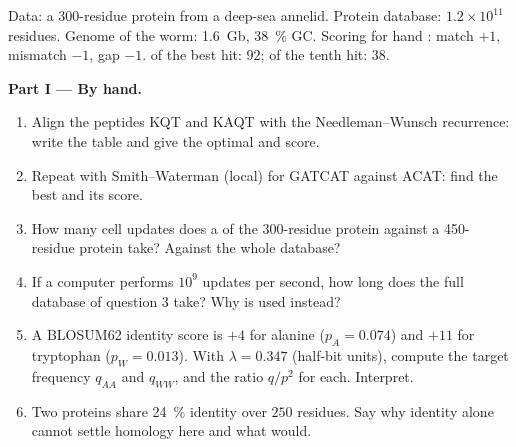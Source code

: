 \begin{problem}
\label{pb:b3:bioinformatics:1}
Data: a \num{300}-residue protein from a deep-sea annelid. Protein
database: $1.2\times 10^{11}$ residues. Genome of the worm:
\qty{1.6}{Gb}, \qty{38}{\%} GC. Scoring for hand : match $+1$,
mismatch $-1$, gap $-1$.  of the best  hit: $92$; of the
tenth hit: $38$.

\medskip
\noindent\textbf{Part I --- By hand.}
\begin{enumerate}
  \item Align the peptides KQT and KAQT with the Needleman--Wunsch
        recurrence: write the table and give the optimal  and
        score.
  \item Repeat with Smith--Waterman (local) for GATCAT against ACAT:
        find the best  and its score.
  \item How many cell updates does a  of the
        \num{300}-residue protein against a \num{450}-residue protein
        take? Against the whole database?
  \item If a computer performs $10^{9}$ updates per second, how long
        does the full database  of question 3 take? Why is
         used instead?
  \item A BLOSUM62 identity score is $+4$ for alanine ($p_{A} =
        0.074$) and $+11$ for tryptophan ($p_{W} = 0.013$). With
        $\lambda = 0.347$ (half-bit units), compute the target
        frequency $q_{AA}$ and $q_{WW}$, and the ratio $q/p^{2}$ for
        each. Interpret.
  \item Two proteins share \qty{24}{\%} identity over $250$ residues.
        Say why identity alone cannot settle homology here and what
        would.
\end{enumerate}


\end{problem}
